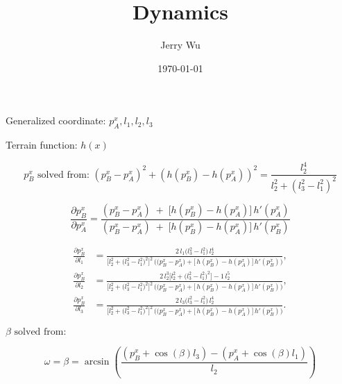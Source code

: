 \documentclass[10pt]{article}
\title{\textbf{Dynamics}}
\author{Jerry Wu}
\date{\today}
\begin{document}
\maketitle

\noindent
Generalized coordinate: \(p_A^x, l_1, l_2, l_3\)

\vspace{0.5em}

Terrain function: \(h(x)\)

\vspace{1em}

\[
p_B^x \text{ solved from: } (p_B^x - p_A^x)^2 + (h(p_B^x) - h(p_A^x))^2 = \frac{l_2^4}{l_2^2 + (l_3^2 - l_1^2)^2}
\]

\[
\frac{\partial p_B^{x}}{\partial p_A^{x}}
=
\frac{(p_B^{x}-p_A^{x}) \;+\;
      \bigl[h(p_B^{x})-h(p_A^{x})\bigr]\,h'(p_A^{x})}
     {(p_B^{x}-p_A^{x}) \;+\;
      \bigl[h(p_B^{x})-h(p_A^{x})\bigr]\,h'(p_B^{x})}
\]

\[
\begin{aligned}
\frac{\partial p_B^{x}}{\partial l_1}
   &= \frac{
        2\,l_1\bigl(l_3^{2}-l_1^{2}\bigr)\,l_2^{4}
      }{
        \bigl[l_2^{2}+\bigl(l_3^{2}-l_1^{2}\bigr)^{2}\bigr]^{2}\,
        \big(
          \bigl(p_B^{x}-p_A^{x}\bigr)
          +\bigl[\,h(p_B^{x})-h(p_A^{x})\bigr]\,
          h'(p_B^{x})
        \big)
      },
\\[10pt]
\frac{\partial p_B^{x}}{\partial l_2}
   &= \frac{
        2\,l_2^{3}\bigl[l_2^{2}+\bigl(l_3^{2}-l_1^{2}\bigr)^{2}\bigr]
        -1\,l_2^{5}
      }{
        \bigl[l_2^{2}+\bigl(l_3^{2}-l_1^{2}\bigr)^{2}\bigr]^{2}\,
        \big(
          \bigl(p_B^{x}-p_A^{x}\bigr)
          +\bigl[\,h(p_B^{x})-h(p_A^{x})\bigr]\,
          h'(p_B^{x})
        \big)
      },
\\[10pt]
\frac{\partial p_B^{x}}{\partial l_3}
   &= \frac{
        2\,l_3\bigl(l_3^{2}-l_1^{2}\bigr)\,l_2^{4}
      }{
        \bigl[l_2^{2}+\bigl(l_3^{2}-l_1^{2}\bigr)^{2}\bigr]^{2}\,
        \big(
          \bigl(p_B^{x}-p_A^{x}\bigr)
          +\bigl[\,h(p_B^{x})-h(p_A^{x})\bigr]\,
          h'(p_B^{x})
        \big)
      }.
\end{aligned}
\]


\vspace{1em}

\(\beta \text{ solved from: } \)

\[
\omega = \beta = \arcsin\left( \frac{(p_B^x + \cos(\beta) l_3) - (p_A^x + \cos(\beta) l_1)}{l_2} \right)
\]

\vspace{1em}
\end{document}
